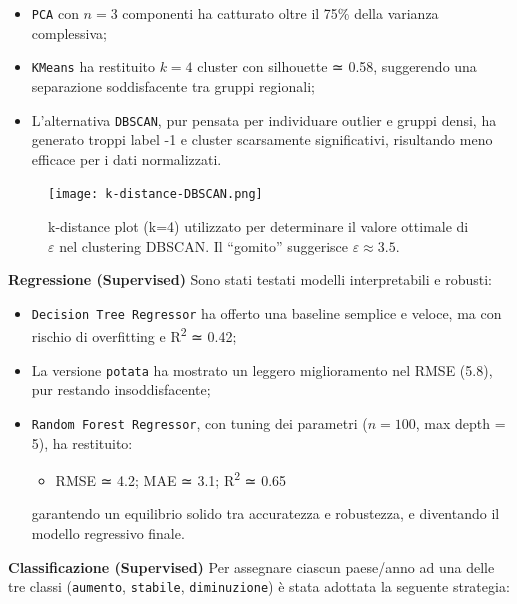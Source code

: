 \documentclass[conference]{IEEEtran}
\begin{document}
\begin{itemize} \item \texttt{PCA} con $n = 3$ componenti ha catturato oltre il 75\% della varianza complessiva; \item \texttt{KMeans} ha restituito $k = 4$ cluster con silhouette ≃ 0.58, suggerendo una separazione soddisfacente tra gruppi regionali; \item L’alternativa \texttt{DBSCAN}, pur pensata per individuare outlier e gruppi densi, ha generato troppi label -1 e cluster scarsamente significativi, risultando meno efficace per i dati normalizzati. \end{itemize}
\begin{figure}[H]
\centering
\texttt{[image: k-distance-DBSCAN.png]}
\caption{k-distance plot (k=4) utilizzato per determinare il valore ottimale di $\varepsilon$ nel clustering DBSCAN. Il “gomito” suggerisce $\varepsilon \approx 3.5$.}
\label{fig:dbscan-kdistance}
\end{figure}

\vspace{0.5em} \noindent\textbf{Regressione (Supervised)} Sono stati testati modelli interpretabili e robusti:

\begin{itemize} \item \texttt{Decision Tree Regressor} ha offerto una baseline semplice e veloce, ma con rischio di overfitting e R\textsuperscript{2} ≃ 0.42; \item La versione \texttt{potata} ha mostrato un leggero miglioramento nel RMSE (5.8), pur restando insoddisfacente; \item \texttt{Random Forest Regressor}, con tuning dei parametri ($n = 100$, max depth = 5), ha restituito: \begin{itemize} \item RMSE ≃ 4.2; MAE ≃ 3.1; R\textsuperscript{2} ≃ 0.65 \end{itemize} garantendo un equilibrio solido tra accuratezza e robustezza, e diventando il modello regressivo finale. \end{itemize}

\vspace{0.5em} \noindent\textbf{Classificazione (Supervised)} Per assegnare ciascun paese/anno ad una delle tre classi (\texttt{aumento}, \texttt{stabile}, \texttt{diminuzione}) è stata adottata la seguente strategia:
\end{document}
